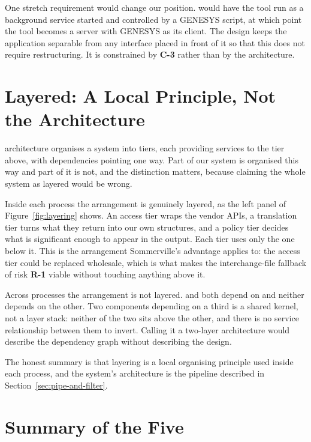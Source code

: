 One stretch requirement would change our position.  would have the
tool run as a background service started and controlled by a GENESYS script, at
which point the tool becomes a server with GENESYS as its client. The design
keeps the application separable from any interface placed in front of it so that
this does not require restructuring. It is constrained by \textbf{C-3} rather
than by the architecture.

\section{Layered: A Local Principle, Not the Architecture}
\label{sec:layered}


 architecture organises a system into tiers, each providing
services to the tier above, with dependencies pointing one way. Part of our
system is organised this way and part of it is not, and the distinction matters,
because claiming the whole system as layered would be wrong.

Inside each process the arrangement is genuinely layered, as the left panel of
Figure~\ref{fig:layering} shows. An access tier wraps the vendor APIs, a
translation tier turns what they return into our own structures, and a policy
tier decides what is significant enough to appear in the output. Each tier uses
only the one below it. This is the arrangement Sommerville's advantage applies
to: the access tier could be replaced wholesale, which is what makes the
interchange-file fallback of risk \textbf{R-1} viable without touching anything
above it.

Across processes the arrangement is not layered.  and
 both depend on  and neither
depends on the other. Two components depending on a third is a shared kernel,
not a layer stack: neither of the two sits above the other, and there is no
service relationship between them to invert. Calling it a two-layer architecture
would describe the dependency graph without describing the design.

The honest summary is that layering is a local organising principle used inside
each process, and the system's architecture is the pipeline described in
Section~\ref{sec:pipe-and-filter}.

\section{Summary of the Five}

